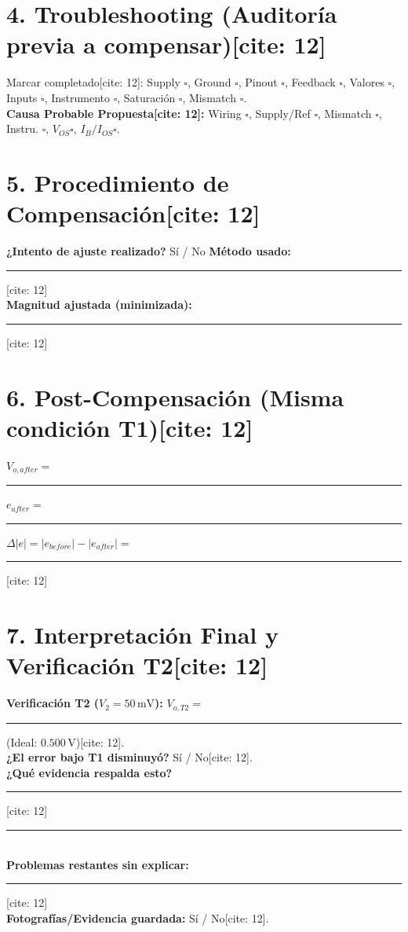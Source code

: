 \documentclass[11pt, a4paper]{article}
\begin{document}
\section*{4. Troubleshooting (Auditoría previa a compensar)[cite: 12]}
Marcar completado[cite: 12]: Supply $\square$, Ground $\square$, Pinout $\square$, Feedback $\square$, Valores $\square$, Inputs $\square$, Instrumento $\square$, Saturación $\square$, Mismatch $\square$. \\
\textbf{Causa Probable Propuesta[cite: 12]:} Wiring $\square$, Supply/Ref $\square$, Mismatch $\square$, Instru. $\square$, $V_{OS} \square$, $I_B/I_{OS} \square$.

\section*{5. Procedimiento de Compensación[cite: 12]}
\textbf{¿Intento de ajuste realizado?} Sí / No \quad \textbf{Método usado:} \rule{6cm}{0.4pt}[cite: 12] \\
\textbf{Magnitud ajustada (minimizada):} \rule{6cm}{0.4pt}[cite: 12]

\section*{6. Post-Compensación (Misma condición T1)[cite: 12]}
$V_{o,after} =$ \rule{2cm}{0.4pt} \quad $e_{after} =$ \rule{2cm}{0.4pt} \quad $\Delta|e| = |e_{before}| - |e_{after}| =$ \rule{2cm}{0.4pt}[cite: 12]

\section*{7. Interpretación Final y Verificación T2[cite: 12]}
\textbf{Verificación T2 ($V_2 = 50\,\text{mV}$):} $V_{o,T2} =$ \rule{2cm}{0.4pt} (Ideal: $0.500\,\text{V}$)[cite: 12]. \\
\textbf{¿El error bajo T1 disminuyó?} Sí / No[cite: 12]. \\
\textbf{¿Qué evidencia respalda esto?} \rule{10cm}{0.4pt}[cite: 12] \\
\rule{\textwidth}{0.4pt} \\
\textbf{Problemas restantes sin explicar:} \rule{10cm}{0.4pt}[cite: 12] \\
\textbf{Fotografías/Evidencia guardada:} Sí / No[cite: 12].
\end{document}
